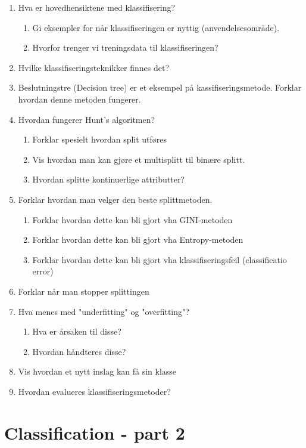 		\begin{enumerate}
			\item Hva er hovedhensiktene med klassifisering?
				\begin{enumerate}
					\item Gi eksempler for når klassifiseringen er nyttig (anvendelsesområde).
					\item Hvorfor trenger vi treningsdata til klassifiseringen?
				\end{enumerate}
			\item Hvilke klassifiseringsteknikker finnes det?
			\item Beslutningstre (Decision tree) er et eksempel på kassifiseringsmetode.
			Forklar hvordan denne metoden fungerer.
			\item Hvordan fungerer Hunt's algoritmen?
				\begin{enumerate}
					\item Forklar spesielt hvordan split utføres
					\item Vis hvordan man kan gjøre et multisplitt til binære splitt.
					\item Hvordan splitte kontinuerlige attributter?
				\end{enumerate}
			\item Forklar hvordan man velger den beste splittmetoden.
				\begin{enumerate}
					\item Forklar hvordan dette kan bli gjort vha GINI-metoden
					\item Forklar hvordan dette kan bli gjort vha Entropy-metoden
					\item Forklar hvordan dette kan bli gjort vha klassifiseringsfeil (classificatio error)
				\end{enumerate}
			\item Forklar når man stopper splittingen
			\item Hva menes med "underfitting" og "overfitting"?
				\begin{enumerate}
					\item Hva er årsaken til disse?
					\item Hvordan håndteres disse?
				\end{enumerate}
			\item Vis hvordan et nytt inslag kan få sin klasse
			\item Hvordan evalueres klassifiseringsmetoder?
		\end{enumerate}

	\section{Classification - part 2}

